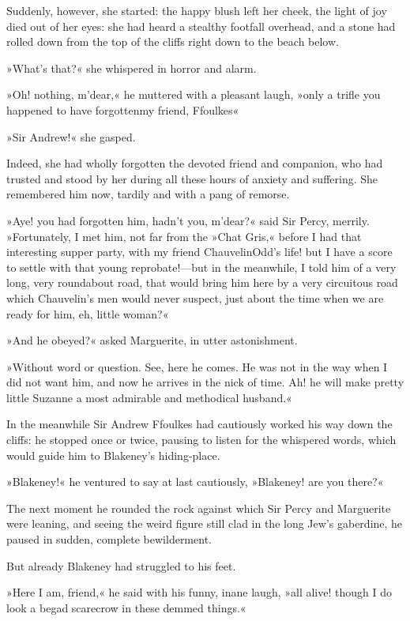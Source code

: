 Suddenly, however, she started: the happy blush left her cheek, the light of joy died out of her eyes: she had heard a stealthy footfall overhead, and a stone had rolled down from the top of the cliffs right down to the beach below.

»What's that?« she whispered in horror and alarm.

»Oh! nothing, m'dear,« he muttered with a pleasant laugh, »only a trifle you happened to have forgotten\textellipsis \allowbreak  my friend, Ffoulkes\textellipsis«

»Sir Andrew!« she gasped.

Indeed, she had wholly forgotten the devoted friend and companion, who had trusted and stood by her during all these hours of anxiety and suffering. She remembered him now, tardily and with a pang of remorse.

»Aye! you had forgotten him, hadn't you, m'dear?« said Sir Percy, merrily. »Fortunately, I met him, not far from the »Chat Gris,« before I had that interesting supper party, with my friend Chauvelin\textellipsis \allowbreak  Odd's life! but I have a score to settle with that young reprobate!—but in the meanwhile, I told him of a very long, very roundabout road, that would bring him here by a very circuitous road which Chauvelin's men would never suspect, just about the time when we are ready for him, eh, little woman?«

»And he obeyed?« asked Marguerite, in utter astonishment.

»Without word or question. See, here he comes. He was not in the way when I did not want him, and now he arrives in the nick of time. Ah! he will make pretty little Suzanne a most admirable and methodical husband.«

In the meanwhile Sir Andrew Ffoulkes had cautiously worked his way down the cliffs: he stopped once or twice, pausing to listen for the whispered words, which would guide him to Blakeney's hiding-place.

»Blakeney!« he ventured to say at last cautiously, »Blakeney! are you there?«

The next moment he rounded the rock against which Sir Percy and Marguerite were leaning, and seeing the weird figure still clad in the long Jew's gaberdine, he paused in sudden, complete bewilderment.

But already Blakeney had struggled to his feet.

»Here I am, friend,« he said with his funny, inane laugh, »all alive! though I do look a begad scarecrow in these demmed things.«


